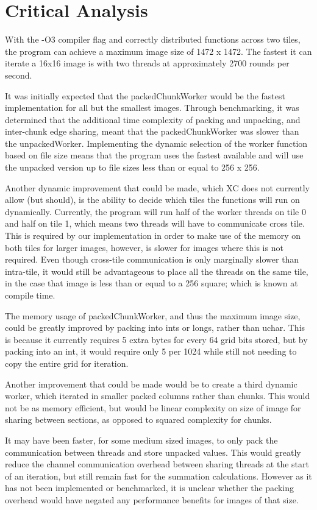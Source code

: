 \documentclass[11pt, oneside]{article}
\begin{document}
\pagebreak
\section{Critical Analysis}
With the -O3 compiler flag and correctly distributed functions across two tiles, the program can achieve a maximum image size of 1472 x 1472. The fastest it can iterate a 16x16 image is with two threads at approximately 2700 rounds per second.

It was initially expected that the packedChunkWorker would be the fastest implementation for all but the smallest images. Through benchmarking, it was determined that the additional time complexity of packing and unpacking, and inter-chunk edge sharing, meant that the packedChunkWorker was slower than the unpackedWorker. Implementing the dynamic selection of the worker function based on file size means that the program uses the fastest available and will use the unpacked version up to file sizes less than or equal to 256 x 256.

Another dynamic improvement that could be made, which XC does not currently allow (but should), is the ability to decide which tiles the functions will run on dynamically. Currently, the program will run half of the worker threads on tile 0 and half on tile 1, which means two threads will have to communicate cross tile. This is required by our implementation in order to make use of the memory on both tiles for larger images, however, is slower for images where this is not required. Even though cross-tile communication is only marginally slower than intra-tile, it would still be advantageous to place all the threads on the same tile, in the case that image is less than or equal to a 256 square; which is known at compile time.

The memory usage of packedChunkWorker, and thus the maximum image size, could be greatly improved by packing into ints or longs, rather than uchar. This is because it currently requires 5 extra bytes for every 64 grid bits stored, but by packing into an int, it would require only 5 per 1024 while still not needing to copy the entire grid for iteration.

Another improvement that could be made would be to create a third dynamic worker, which iterated in smaller packed columns rather than chunks. This would not be as memory efficient, but would be linear complexity on size of image for sharing between sections, as opposed to squared complexity for chunks.

It may have been faster, for some medium sized images, to only pack the communication between threads and store unpacked values. This would greatly reduce the channel communication overhead between sharing threads at the start of an iteration, but still remain fast for the summation calculations. However as it has not been implemented or benchmarked, it is unclear whether the packing overhead would have negated any performance benefits for images of that size.
\end{document}
